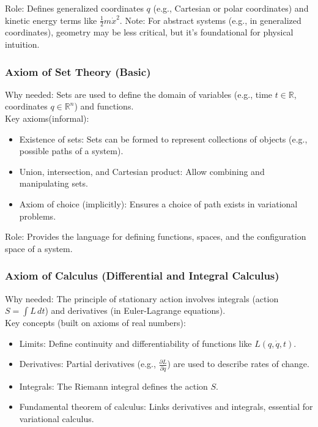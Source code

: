 Role: Defines generalized coordinates $ q $ (e.g., Cartesian or polar coordinates) and kinetic energy terms like $ \frac{1}{2} m \dot{x}^2 $.
Note: For abstract systems (e.g., in generalized coordinates), geometry may be less critical, but it’s foundational for physical intuition.

\subsubsection{Axiom of Set Theory (Basic)}
Why needed: Sets are used to define the domain of variables (e.g., time $ t \in \mathbb{R} $, coordinates $ q \in \mathbb{R}^n $) and functions.
\\
Key axioms(informal):
\begin{itemize}
    \item Existence of sets: Sets can be formed to represent collections of objects (e.g., possible paths of a system).
    \item Union, intersection, and Cartesian product: Allow combining and manipulating sets.
    \item Axiom of choice (implicitly): Ensures a choice of path exists in variational problems.

\end{itemize}

Role: Provides the language for defining functions, spaces, and the configuration space of a system.

\subsubsection{Axiom of Calculus (Differential and Integral Calculus)}
Why needed: The principle of stationary action involves integrals (action $ S = \int L \, dt $) and derivatives (in Euler-Lagrange equations).
\\
Key concepts (built on axioms of real numbers):
\begin{itemize}
    \item Limits: Define continuity and differentiability of functions like $ L(q, \dot{q}, t) $.
    \item Derivatives: Partial derivatives (e.g., $ \frac{\partial L}{\partial q} $) are used to describe rates of change.
    \item Integrals: The Riemann integral defines the action $ S $.
    \item Fundamental theorem of calculus: Links derivatives and integrals, essential for variational calculus.

\end{itemize}


